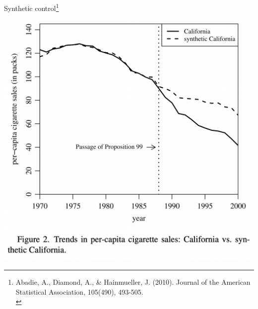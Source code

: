 \documentclass{beamer}
\newcommand\bref[2]{\href{#1}{\color{blue}{#2}}}
\begin{document}
\begin{frame}{Synthetic control\footnote{Abadie, A., Diamond, A., \& Hainmueller, J. (2010). \bref{http://www.jenshainmueller.de/Paper/ccs.pdf}{Synthetic control methods for comparative case studies: Estimating the effect of California’s tobacco control program.} Journal of the American Statistical Association, 105(490), 493-505.\\{}}}

\centering
\includegraphics[height = .6\textheight]{figures/synth_fig2}

\end{frame}
\end{document}
